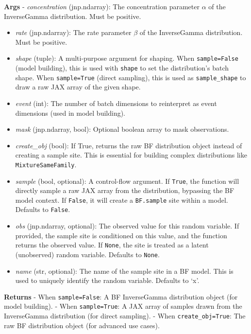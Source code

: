 \documentclass[
  letterpaper,
  DIV=11,
  numbers=noendperiod]{scrartcl}
\begin{document}
\textbf{Args} - \emph{concentration} (jnp.ndarray): The concentration
parameter \(\alpha\) of the InverseGamma distribution. Must be positive.

\begin{itemize}
\item
  \emph{rate} (jnp.ndarray): The rate parameter \(\beta\) of the
  InverseGamma distribution. Must be positive.
\item
  \emph{shape} (tuple): A multi-purpose argument for shaping. When
  \texttt{sample=False} (model building), this is used with
  \texttt{shape} to set the distribution's batch shape. When
  \texttt{sample=True} (direct sampling), this is used as
  \texttt{sample\_shape} to draw a raw JAX array of the given shape.
\item
  \emph{event} (int): The number of batch dimensions to reinterpret as
  event dimensions (used in model building).
\item
  \emph{mask} (jnp.ndarray, bool): Optional boolean array to mask
  observations.
\item
  \emph{create\_obj} (bool): If True, returns the raw BF distribution
  object instead of creating a sample site. This is essential for
  building complex distributions like \texttt{MixtureSameFamily}.
\item
  \emph{sample} (bool, optional): A control-flow argument. If
  \texttt{True}, the function will directly sample a raw JAX array from
  the distribution, bypassing the BF model context. If \texttt{False},
  it will create a \texttt{BF.sample} site within a model. Defaults to
  \texttt{False}.
\item
  \emph{obs} (jnp.ndarray, optional): The observed value for this random
  variable. If provided, the sample site is conditioned on this value,
  and the function returns the observed value. If \texttt{None}, the
  site is treated as a latent (unobserved) random variable. Defaults to
  \texttt{None}.
\item
  \emph{name} (str, optional): The name of the sample site in a BF
  model. This is used to uniquely identify the random variable. Defaults
  to `x'.
\end{itemize}

\textbf{Returns} - When \texttt{sample=False}: A BF InverseGamma
distribution object (for model building). - When \texttt{sample=True}: A
JAX array of samples drawn from the InverseGamma distribution (for
direct sampling). - When \texttt{create\_obj=True}: The raw BF
distribution object (for advanced use cases).
\end{document}
